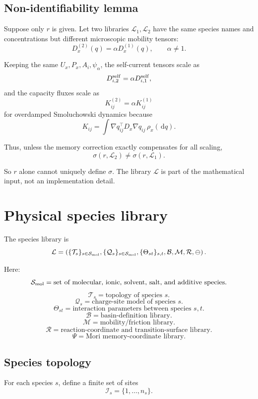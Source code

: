 \documentclass[11pt]{article}
\newcommand{\dd}{\,\mathrm d}
\begin{document}
\subsection{Non-identifiability lemma}

Suppose only \(r\) is given. Let two libraries \(\mathcal L_1,\mathcal L_2\)
have the same species names and concentrations but different microscopic
mobility tensors:
\[
D_x^{(2)}(q)=\alpha D_x^{(1)}(q),
\qquad
\alpha\neq1.
\]

Keeping the same \(U_x,P_x,A_i,\psi_\alpha\), the self-current tensors scale as
\[
D_{i,2}^{\rm self}
=
\alpha D_{i,1}^{\rm self},
\]
and the capacity fluxes scale as
\[
K_{ij}^{(2)}
=
\alpha K_{ij}^{(1)}
\]
for overdamped Smoluchowski dynamics because
\[
K_{ij}
=
\int
\nabla q_{ij}^{\top}D_x\nabla q_{ij}\,\rho_x(\dd q).
\]

Thus, unless the memory correction exactly compensates for all scaling,
\[
\sigma(r,\mathcal L_2)\neq\sigma(r,\mathcal L_1).
\]

So \(r\) alone cannot uniquely define \(\sigma\). The library \(\mathcal L\) is
part of the mathematical input, not an implementation detail.

\section{Physical species library}
\label{sec:library}

The species library is
\[
\mathcal L=
\left(
\{\mathcal T_s\}_{s\in\mathcal S_{\rm mol}},
\{\mathcal Q_s\}_{s\in\mathcal S_{\rm mol}},
\{\Theta_{st}\}_{s,t},
\mathcal B,
\mathcal M,
\mathcal R,
\mathcal \Psi
\right).
\]

Here:
\[
\mathcal S_{\rm mol}
=
\text{set of molecular, ionic, solvent, salt, and additive species}.
\]
\[
\mathcal T_s
=
\text{topology of species }s.
\]
\[
\mathcal Q_s
=
\text{charge-site model of species }s.
\]
\[
\Theta_{st}
=
\text{interaction parameters between species }s,t.
\]
\[
\mathcal B
=
\text{basin-definition library}.
\]
\[
\mathcal M
=
\text{mobility/friction library}.
\]
\[
\mathcal R
=
\text{reaction-coordinate and transition-surface library}.
\]
\[
\mathcal \Psi
=
\text{Mori memory-coordinate library}.
\]

\subsection{Species topology}

For each species \(s\), define a finite set of sites
\[
\mathcal I_s=\{1,\ldots,n_s\}.
\]
\end{document}

